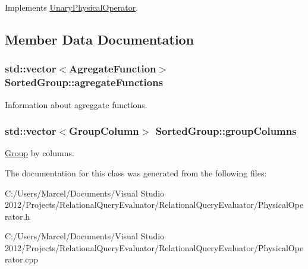 Implements \hyperlink{class_unary_physical_operator_a3b0160d380149213561ef2ba479dbf6a}{Unary\+Physical\+Operator}.



\subsection{Member Data Documentation}
\hypertarget{class_sorted_group_ab3d59776a6c7516df046d09b0bcd2f4e}{
\subsubsection[{agregate\+Functions}]{\setlength{\rightskip}{0pt plus 5cm}std\+::vector$<${\bf Agregate\+Function}$>$ Sorted\+Group\+::agregate\+Functions}}\label{class_sorted_group_ab3d59776a6c7516df046d09b0bcd2f4e}
Information about agreggate functions. \hypertarget{class_sorted_group_af4ccedafc52d06be95d88eec6e235ba2}{
\subsubsection[{group\+Columns}]{\setlength{\rightskip}{0pt plus 5cm}std\+::vector$<${\bf Group\+Column}$>$ Sorted\+Group\+::group\+Columns}}\label{class_sorted_group_af4ccedafc52d06be95d88eec6e235ba2}
\hyperlink{class_group}{Group} by columns. 

The documentation for this class was generated from the following files\+:\begin{DoxyCompactItemize}
\item 
C\+:/\+Users/\+Marcel/\+Documents/\+Visual Studio 2012/\+Projects/\+Relational\+Query\+Evaluator/\+Relational\+Query\+Evaluator/Physical\+Operator.\+h\item 
C\+:/\+Users/\+Marcel/\+Documents/\+Visual Studio 2012/\+Projects/\+Relational\+Query\+Evaluator/\+Relational\+Query\+Evaluator/Physical\+Operator.\+cpp\end{DoxyCompactItemize}
